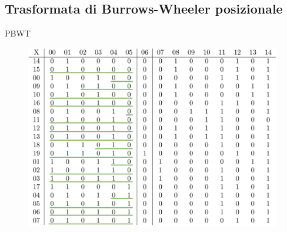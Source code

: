 \documentclass[]{beamer}
\begin{document}
\subsection{Trasformata di Burrows-Wheeler posizionale}
\begin{frame}{PBWT}
  \begin{figure}[H]
    \centering
    \includegraphics[scale = 0.205]{img/matrix1.pdf}

\end{figure}
\end{frame}
\end{document}
